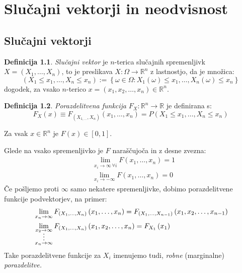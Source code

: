 \documentclass[12pt]{book}
\def\n{\noindent}
\theoremstyle{definition}
\newtheorem{definicija}{Definicija}
\theoremstyle{plain}
\theoremstyle{plain}
\theoremstyle{plain}
\theoremstyle{remark}
\edef\x{\pgfmathresult}%
\begin{document}
\chapter{Slučajni vektorji in neodvisnost}

\section{Slučajni vektorji}

\begin{definicija}
    \emph{Slučajni vektor} je $n$-terica slučajnih spremenljivk $X=\left(X_1, \ldots, X_n\right)$, to je preslikava $X:\Omega \to \mathbb{R}^n$ z lastnostjo, da je množica: 
    $$
    \left(X_1 \leq x_1, \ldots, X_n \leq x_n\right):=\left\{\omega \in \Omega: X_1(\omega) \leq x_1,\ldots, X_n(\omega) \leq x_n\right\}
    $$
    dogodek, za vsako $n$-terico $x=\left(x_1, x_2, \ldots, x_n\right) \in \mathbb{R}^n$.
\end{definicija}

\begin{definicija}
    \emph{Porazdelitvena funkcija} $F_X: \mathbb{R}^n \to \mathbb{R}$ je definirana s:
    $$
    F_X(x) \equiv F_{\left(X_{1, \ldots}, X_n\right)}\left(x_1, \ldots, x_n\right)=P\left(X_1 \leq x_1, \ldots, X_n \leq x_n\right)
    $$
\end{definicija}

\n Za vsak $x \in \mathbb{R}^n$ je $F(x) \in[0, 1]$.

\n Glede na vsako spremenljivko je $F$ naraščujoča in z desne zvezna:
$$
\begin{aligned}
    &\lim _{x_i \to \infty \, \forall i} F\left(x_1, \ldots, x_n\right)=1 \\
    &\lim _{x_i \rightarrow-\infty} F\left(x_1, \ldots, x_n\right)=0
\end{aligned}
$$
Če pošljemo proti $\infty$ samo nekatere spremenljivke, dobimo porazdelitvene funkcije podvektorjev, na primer:
$$
\begin{aligned}
    &\lim _{x_n \to \infty} F_{\left(X_1, \ldots, X_{n}\right)}\left(x_1, \dots , x_n\right)=F_{\left(X_1, \ldots, X_{n-1}\right)}\left(x_1, x_2, \ldots, x_{n-1}\right) \\
    &\lim _{\substack{x_2 \to \infty \vspace{-5pt} \\ \vdots \\x_n \to \infty}} F_{\left(X_1, \ldots, X_{n}\right)}\left(x_1, x_2, \ldots, x_n\right)=F_{X_1}\left(x_1\right)
\end{aligned}
$$
Take porazdelitvene funkcije za $X_i$ imenujemo tudi, \emph{robne} (marginalne) \emph{porazdelitve.}
\end{document}
